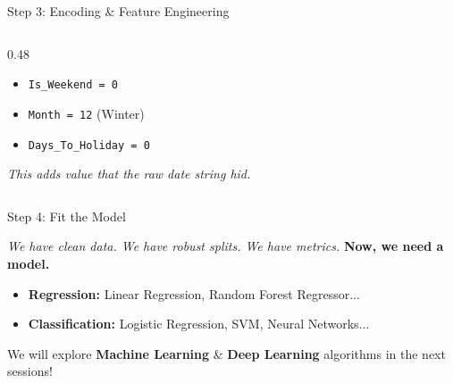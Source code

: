 \begin{frame}{Step 3: Encoding \& Feature Engineering}
\begin{columns}[T]
\begin{column}{0.48\textwidth}
\begin{tcolorbox}[colback=green!5, boxrule=0pt]
                \begin{itemize}
                    \item \texttt{Is\_Weekend = 0}
                    \item \texttt{Month = 12} (Winter)
                    \item \texttt{Days\_To\_Holiday = 0}
                \end{itemize}
            \end{tcolorbox}
            \small \textit{This adds value that the raw date string hid.}
        \end{column}
    \end{columns}
\end{frame}


\begin{frame}{Step 4: Fit the Model}

    \centering
    \large
    \textit{We have clean data. We have robust splits. We have metrics.}
    \vspace{0.3em} %
    \textbf{Now, we need a model.}
    
    \vspace{0.8em} %

    \begin{tcolorbox}[colback=blue!5, colframe=blue!50, title=The Options, width=\textwidth]
        \begin{itemize}
            \item \textbf{Regression:} Linear Regression, Random Forest Regressor...
            \item \textbf{Classification:} Logistic Regression, SVM, Neural Networks...
        \end{itemize}
    \end{tcolorbox}

    \centering
    \begin{block}{}
        \centering
        We will explore \textbf{Machine Learning} \& \textbf{Deep Learning} algorithms in the next sessions!
    \end{block}

\end{frame}

